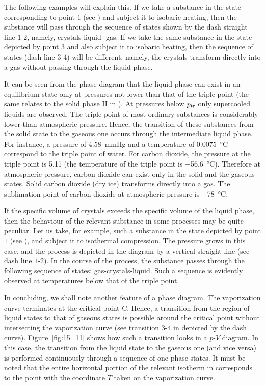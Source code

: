 The following examples will explain this. If we take a substance in the state corresponding to point $1$ (see ) and subject it to isobaric heating, then the substance will pass through the sequence of states shown by the dash straight line $1$-$2$, namely, crystals-liquid-
gas. If we take the same substance in the state depicted by point $3$ and also subject it to isobaric heating, then the sequence of states (dash line $3$-$4$) will be different, namely, the crystals transform directly into a gas without passing through the liquid phase.

It can be seen from the phase diagram that the liquid phase can exist in an equilibrium state only at pressures not lower than that of the triple point (the same relates to the solid phase II in ). At pressures below $p_{\text{tr}}$ only supercooled liquids are observed. The triple point of most ordinary substances is considerably lower than atmospheric pressure. Hence, the transition of these substances from the solid state to the gaseous one occurs through the intermediate liquid phase. For instance, a pressure of \SI{4.58}{\mmHg} and a temperature of \SI{0.0075}{\degreeCelsius} correspond to the triple point of water. For carbon dioxide, the pressure at the triple point is \SI{5.11}{\atm} (the temperature of the triple point is \SI{-56.6}{\degreeCelsius}). Therefore at atmospheric pressure, carbon dioxide can exist only in the solid and the gaseous states. Solid carbon dioxide (dry ice) transforms directly into a gas. The sublimation point of carbon dioxide at atmospheric pressure is \SI{-78}{\degreeCelsius}.

If the specific volume of crystals exceeds the specific volume of the liquid phase, then the behaviour of the relevant substance in some processes may be quite peculiar. Let us take, for example, such a substance in the state depicted by point $1$ (see ), and subject it to isothermal compression. The pressure grows in this case, and the process is depicted in the diagram by a vertical straight line (see dash line $1$-$2$). In the course of the process, the substance passes through the following sequence of states: gas-crystals-liquid. Such a sequence is evidently observed at temperatures below that of the triple point.

In concluding, we shall note another feature of a phase diagram. The vaporization curve terminates at the critical point C. Hence, a transition from the region of liquid states to that of gaseous states is possible around the critical point without intersecting the vaporization curve (see transition $3$-$4$ in  depicted by the dash curve). Figure~\ref{fig:15_11} shows how such a transition looks in a $p$-$V$ diagram. In this case, the transition from the liquid state to the gaseous one (and vice versa) is performed continuously through a sequence of one-phase states. It must be noted that the entire horizontal portion of the relevant isotherm in  corresponds to the point with the coordinate $T$ taken on the vaporization curve.

